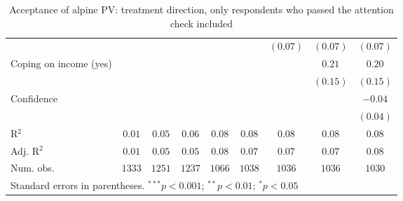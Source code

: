 \begin{table}[h]
\begin{center}
\begin{tabular}{l c c c c c c c c}
                                                                                &              &              &              &               &               & $(0.07)$      & $(0.07)$      & $(0.07)$      \\
Coping on income (yes)                                                          &              &              &              &               &               &               & $0.21$        & $0.20$        \\
                                                                                &              &              &              &               &               &               & $(0.15)$      & $(0.15)$      \\
Confidence                                                                      &              &              &              &               &               &               &               & $-0.04$       \\
                                                                                &              &              &              &               &               &               &               & $(0.04)$      \\
\hline
R$^2$                                                                           & $0.01$       & $0.05$       & $0.06$       & $0.08$        & $0.08$        & $0.08$        & $0.08$        & $0.08$        \\
Adj. R$^2$                                                                      & $0.01$       & $0.05$       & $0.05$       & $0.08$        & $0.07$        & $0.07$        & $0.07$        & $0.08$        \\
Num. obs.                                                                       & $1333$       & $1251$       & $1237$       & $1066$        & $1038$        & $1036$        & $1036$        & $1030$        \\
\hline
\multicolumn{9}{l}{\scriptsize{Standard errors in parentheses. $^{***}p<0.001$; $^{**}p<0.01$; $^{*}p<0.05$}}
\end{tabular}
\caption{Acceptance of alpine PV: treatment direction, only respondents who passed the attention check included}
\label{table:acceptance_alpine_pv_speeders_excluded}
\end{center}
\end{table}
